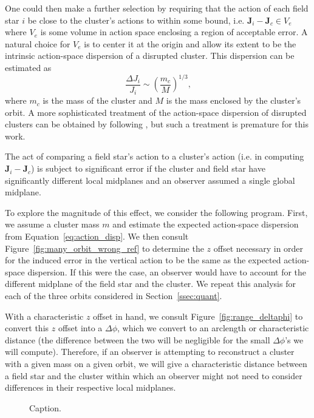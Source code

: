 \documentclass[twocolumn]{aastex62}
\newcommand{\beq}{\begin{equation}}
\newcommand{\eeq}{\end{equation}}
\begin{document}
One could then make a further selection by requiring that the action of each
field star $i$ be close to the cluster's actions to within some bound, i.e.
$\bm{J}_i - \bm{J}_c \in V_e$ where $V_e$ is some volume in action space
enclosing a region of acceptable error. A natural choice for $V_e$ is to
center it at the origin and allow its extent to be the intrinsic action-space
dispersion of a disrupted cluster. This dispersion can be estimated as
\citep[\S~8.3.3][]{2008gady.book.....B}
\beq \label{eq:action_disp}
\frac{\Delta J_i}{J_i} \sim \left(\frac{m_c}{M}\right)^{1/3}\text{,}
\eeq
where $m_c$ is the mass of the cluster and $M$ is the mass enclosed by the
cluster's orbit. A more sophisticated treatment of the action-space dispersion
of disrupted clusters can be obtained by following
\citet{2011MNRAS.413.1852E}, but such a treatment is premature for this work.

The act of comparing a field star's action to a cluster's action (i.e. in
computing $\bm{J}_i - \bm{J}_c$) is subject to significant error if the
cluster and field star have significantly different local midplanes and an
observer assumed a single global midplane.

To explore the magnitude of this effect, we consider the following program.
First, we assume a cluster mass $m$ and estimate the expected action-space
dispersion from Equation~\ref{eq:action_disp}. We then consult
Figure~\ref{fig:many_orbit_wrong_ref} to determine the $z$ offset necessary in
order for the induced error in the vertical action to be the same as the
expected action-space dispersion. If this were the case, an observer would
have to account for the different midplane of the field star and the cluster.
We repeat this analysis for each of the three orbits considered in
Section~\ref{ssec:quant}.

With a characteristic $z$ offset in hand, we consult
Figure~\ref{fig:range_deltaphi} to convert this $z$ offset into a $\Delta
\phi$, which we convert to an arclength or characteristic distance (the
difference between the two will be negligible for the small $\Delta \phi$'s we
will compute). Therefore, if an observer is attempting to reconstruct a
cluster with a given mass on a given orbit, we will give a characteristic
distance between a field star and the cluster within which an observer might
not need to consider differences in their respective local midplanes.

\begin{figure}
\caption{Caption.}
\label{fig:cluster_offset}
\end{figure}
\end{document}
